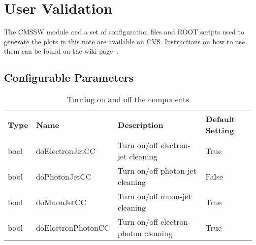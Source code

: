 \documentclass{cmspaper}
\begin{document}
\section{User Validation}
The CMSSW module and a set of configuration files and ROOT scripts used to
generate the plots in this note are available on CVS. Instructions on how to use
them can be found on the wiki page~\cite{twiki}.


\clearpage
\begin{appendix}
\section{Configurable Parameters}

\begin{table}[h]
\caption{Turning on and off the components}
\begin{center}
\begin{tabular}{l|l|l|l}
\textbf{Type} & \textbf{Name} & \textbf{Description} & \textbf{Default
    Setting} \\ \hline
    bool & doElectronJetCC   & Turn on/off electron-jet cleaning & True
    \\\hline
    bool & doPhotonJetCC     & Turn on/off photon-jet cleaning  & False
    \\\hline
    bool & doMuonJetCC       & Turn on/off muon-jet cleaning     & True
    \\\hline
    bool & doElectronPhotonCC& Turn on/off electron-photon cleaning & True
\end{tabular}
\end{center}
\label{tab:TurnOnModules}
\end{table}


\end{appendix}
\end{document}
